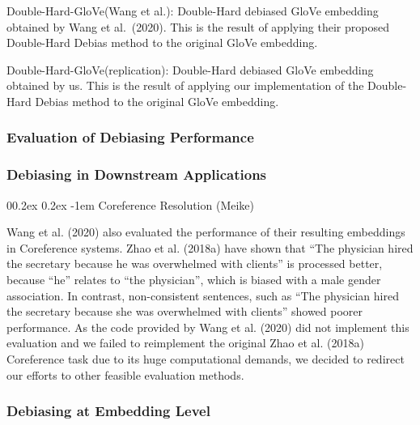 \documentclass[
  english,
  man,floatsintext]{apa6}
\makeatletter
\let\oldparagraph\paragraph
\renewcommand{\paragraph}[1]{\oldparagraph{#1}\mbox{}}
\renewcommand{\paragraph}{\@startsection{paragraph}{4}{\parindent}%
  {0\baselineskip \@plus 0.2ex \@minus 0.2ex}%
  {-1em}%
  {\normalfont\normalsize\bfseries\itshape\typesectitle}}
\makeatother
\begin{document}
Double-Hard-GloVe(Wang et al.): Double-Hard debiased GloVe embedding obtained by Wang et al.~(2020). This is the result of applying their proposed Double-Hard Debias method to the original GloVe embedding.

Double-Hard-GloVe(replication): Double-Hard debiased GloVe embedding obtained by us. This is the result of applying our implementation of the Double-Hard Debias method to the original GloVe embedding.

\hypertarget{evaluation-of-debiasing-performance}{%
\subsubsection{Evaluation of Debiasing Performance}\label{evaluation-of-debiasing-performance}}

\hypertarget{debiasing-in-downstream-applications}{%
\subsubsection{Debiasing in Downstream Applications}\label{debiasing-in-downstream-applications}}

\hypertarget{coreference-resolution-meike}{%
\paragraph{Coreference Resolution (Meike)}\label{coreference-resolution-meike}}

Wang et al. (2020) also evaluated the performance of their resulting embeddings in Coreference systems. Zhao et al. (2018a) have shown that \enquote{The physician hired the secretary because he was overwhelmed with clients} is processed better, because \enquote{he} relates to \enquote{the physician}, which is biased with a male gender association. In contrast, non-consistent sentences, such as \enquote{The physician hired the secretary because she was overwhelmed with clients} showed poorer performance.
As the code provided by Wang et al. (2020) did not implement this evaluation and we failed to reimplement the original Zhao et al. (2018a) Coreference task due to its huge computational demands, we decided to redirect our efforts to other feasible evaluation methods.

\hypertarget{debiasing-at-embedding-level}{%
\subsubsection{Debiasing at Embedding Level}\label{debiasing-at-embedding-level}}
\end{document}
